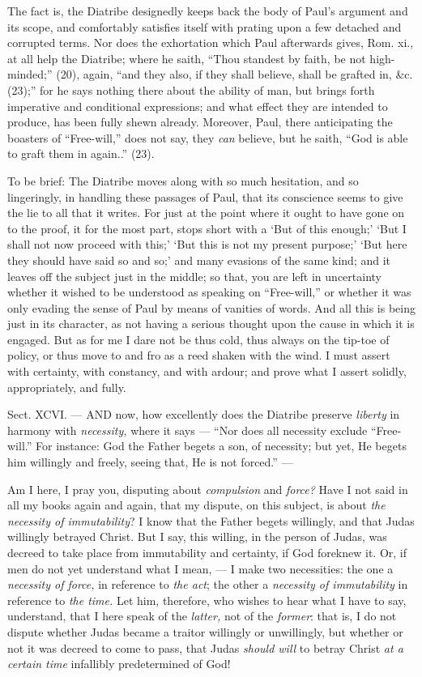 The fact is, the Diatribe designedly keeps back the body of Paul’s argument and its scope, and comfortably satisfies itself with prating upon a few detached and corrupted terms. Nor does the exhortation which Paul afterwards gives, Rom. xi., at all help the Diatribe; where he saith, “Thou standest by faith, be not high-minded;” (20), again, “and they also, if they shall believe, shall be grafted in, \&c. (23);” for he says nothing there about the ability of man, but brings forth imperative and conditional expressions; and what effect they are intended to produce, has been fully shewn already. Moreover, Paul, there anticipating the boasters of “Free-will,” does not say, they \emph{can }believe, but he saith, “God is able to graft them in again..” (23).

To be brief: The Diatribe moves along with so much hesitation, and so lingeringly, in handling these passages of Paul, that its conscience seems to give the lie to all that it writes. For just at the point where it ought to have gone on to the proof, it for the most part, stops short with a ‘But of this enough;’ ‘But I shall not now proceed with this;’ ‘But this is not my present purpose;’ ‘But here they should have said so and so;’ and many evasions of the same kind; and it leaves off the subject just in the middle; so that, you are left in uncertainty whether it wished to be understood as speaking on “Free-will,” or whether it was only evading the sense of Paul by means of vanities of words. And all this is being just in its character, as not having a serious thought upon the cause in which it is engaged. But as for me I dare not be thus cold, thus always on the tip-toe of policy, or thus move to and fro as a reed shaken with the wind. I must assert with certainty, with constancy, and with ardour; and prove what I assert solidly, appropriately, and fully.


Sect. XCVI. — AND now, how excellently does the Diatribe preserve \emph{liberty }in harmony with \emph{necessity, }where it says — “Nor does all necessity exclude “Free-will.” For instance: God the Father begets a son, of necessity; but yet, He begets him willingly and freely, seeing that, He is not forced.” —

Am I here, I pray you, disputing about \emph{compulsion }and \emph{force?} Have I not said in all my books again and again, that my dispute, on this subject, is about \emph{the necessity of immutability}? I know that the Father begets willingly, and that Judas willingly betrayed Christ. But I say, this willing, in the person of Judas, was decreed to take place from immutability and certainty, if God foreknew it. Or, if men do not yet understand what I mean, — I make two necessities: the one a \emph{necessity of force, }in reference to \emph{the act}; the other a \emph{necessity of immutability }in reference to \emph{the time. }Let him, therefore, who wishes to hear what I have to say, understand, that I here speak of the \emph{latter, }not of the \emph{former}: that is, I do not dispute whether Judas became a traitor willingly or unwillingly, but whether or not it was decreed to come to pass, that Judas \emph{should will }to betray Christ \emph{at a certain time }infallibly predetermined of God!

